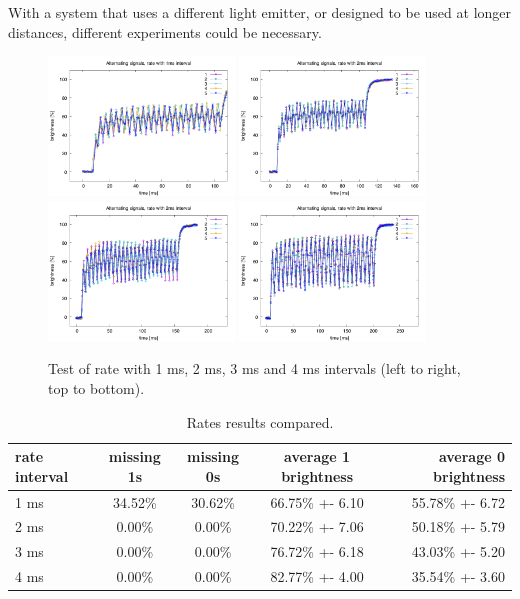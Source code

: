 With a system that uses a different light emitter, or designed to be used at longer distances, different experiments could be necessary.
\begin{figure}[hbt]
\centering
  \includegraphics[height=140px]{img/overlap1}
  \includegraphics[height=140px]{img/overlap2}
  \includegraphics[height=140px]{img/overlap3}
  \includegraphics[height=140px]{img/overlap4}
  \caption{Test of rate with 1 ms, 2 ms, 3 ms and 4 ms intervals (left to right, top to bottom).}
  \label{fig:txpeak}
\end{figure}

\begin{table}[hbt]
\centering
 \begin{tabular}{l c c c r}
   rate interval & missing 1s & missing 0s & average 1 brightness & average 0 brightness \\
   \hline
   1 ms & 34.52\% & 30.62\% & 66.75\% +- 6.10 & 55.78\% +- 6.72 \\
   2 ms & 0.00\% & 0.00\% & 70.22\% +- 7.06 & 50.18\% +- 5.79 \\
   3 ms & 0.00\% & 0.00\% & 76.72\% +- 6.18 & 43.03\% +- 5.20 \\
   4 ms & 0.00\% & 0.00\% & 82.77\% +- 4.00 & 35.54\% +- 3.60 \\
   \hline
	\end{tabular}
  \caption{Rates results compared.}
  \label{ratestable}
\end{table}


